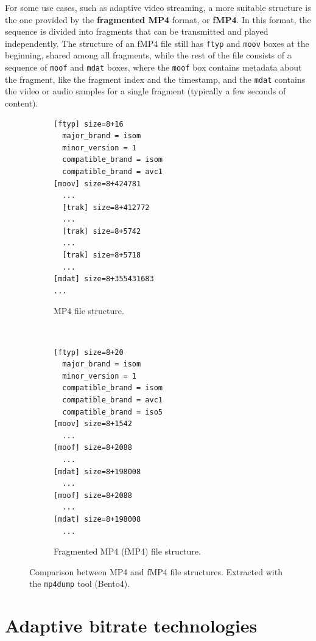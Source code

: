 For some use cases, such as adaptive video streaming, a more suitable structure is the one provided by the \textbf{fragmented MP4} format, or \textbf{fMP4}. In this format, the sequence is divided into fragments that can be transmitted and played independently. The structure of an fMP4 file still has \texttt{ftyp} and \texttt{moov} boxes at the beginning, shared among all fragments, while the rest of the file consists of a sequence of \texttt{moof} and \texttt{mdat} boxes, where the \texttt{moof} box contains metadata about the fragment, like the fragment index and the timestamp, and the \texttt{mdat} contains the video or audio samples for a single fragment (typically a few seconds of content).

\begin{figure}
	\centering
	
	\begin{subfigure}[t]{0.45\textwidth}
		\centering
		\begin{verbatim}
[ftyp] size=8+16
  major_brand = isom
  minor_version = 1
  compatible_brand = isom
  compatible_brand = avc1
[moov] size=8+424781
  ...
  [trak] size=8+412772
  ...
  [trak] size=8+5742
  ...
  [trak] size=8+5718
  ...
[mdat] size=8+355431683
...
		\end{verbatim}
		\caption{MP4 file structure.}
		\label{fig:mp4dump_progressive}
	\end{subfigure}%
	~ 
	\begin{subfigure}[t]{0.45\textwidth}
		\centering
		\begin{verbatim}
[ftyp] size=8+20
  major_brand = isom
  minor_version = 1
  compatible_brand = isom
  compatible_brand = avc1
  compatible_brand = iso5
[moov] size=8+1542
  ...
[moof] size=8+2088
  ...
[mdat] size=8+198008
  ...
[moof] size=8+2088
  ...
[mdat] size=8+198008
  ...
		\end{verbatim}
		\caption{Fragmented MP4 (fMP4) file structure.}
		\label{fig:mp4dump_fragmented}
	\end{subfigure}
	
	\caption{Comparison between MP4 and fMP4 file structures. Extracted with the \texttt{mp4dump} tool (Bento4).}
	\label{fig:mp4dump_progressive}
\end{figure}


\section{Adaptive bitrate technologies}
\label{sec:bg/abr}

